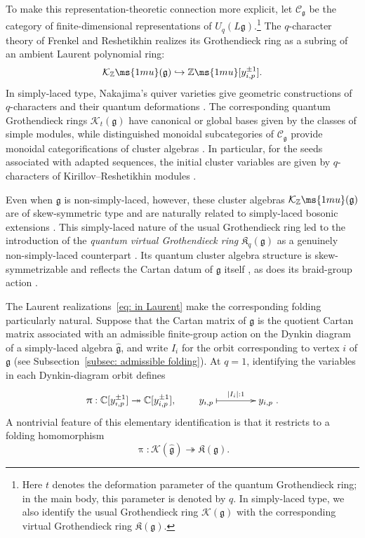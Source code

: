 \documentclass[12pt, leqno]{amsart}
\numberwithin{equation}{section}
\theoremstyle{plain}
\theoremstyle{definition}
\newcommand{\g}{\mathfrak{g}}
\newcommand{\C}{\mathbb{C}}
\newcommand{\Z}{\mathbb{Z}\ms{1mu}}
\newcommand{\im}{\imath}
\newcommand{\hg}{{\widehat{\g}}}
\newcommand{\frakK}{\mathfrak{K}}
\newcommand{\calK}{\mathcal{K}}
\newcommand{\scrC}{\mathscr{C}}
\begin{document}
To make this representation-theoretic connection more explicit, let
$\scrC_\g$ be the category of finite-dimensional representations of
$U_q(L\g)$.\footnote{Here $t$ denotes the deformation parameter of the quantum
Grothendieck ring; in the main body, this parameter is denoted by
$q$. In simply-laced type, we also identify the usual Grothendieck
ring $\calK(\g)$ with the corresponding virtual Grothendieck ring
$\frakK(\g)$.} The $q$-character theory of Frenkel and Reshetikhin
\cite{FR98,FR99} realizes its Grothendieck ring as a subring of an
ambient Laurent polynomial ring:
\begin{align} \label{eq: in Laurent}
\calK_\Z(\g)\hookrightarrow \Z[y_{i,p}^{\pm1}].
\end{align}
In simply-laced type, Nakajima's quiver varieties give geometric
constructions of $q$-characters and their quantum deformations
\cite{Nak01,Nak04,VV03}. The corresponding quantum Grothendieck rings
$\calK_t(\g)$ have canonical or global
bases given by the classes of simple modules, while distinguished
monoidal subcategories of $\scrC_\g$ provide monoidal
categorifications of cluster algebras
\cite{HL10,HL16,KKOP24A,KKOP25M}. In particular, for the seeds associated
with adapted sequences, the initial cluster variables are given by $q$-characters 
of Kirillov--Reshetikhin modules \cite{HL16,FHOO,JLO1}.

Even when $\g$ is non-simply-laced, however, these cluster algebras $\calK_\Z(\g)$
are of skew-symmetric type and are naturally related to simply-laced
bosonic extensions \cite{HL16,FHOO,B21}. This
simply-laced nature of the usual Grothendieck ring led to the
introduction of the \emph{quantum virtual Grothendieck ring}
$\frakK_q(\g)$ as a genuinely non-simply-laced counterpart
\cite{KO23,JLO1}. Its quantum cluster algebra structure is
skew-symmetrizable and reflects the Cartan datum of $\g$ itself
\cite{JLO1}, as does its braid-group action \cite{JLO2}.

The Laurent realizations~\eqref{eq: in Laurent}  make the corresponding
folding particularly natural.
 Suppose that the Cartan matrix of $\g$ is the quotient Cartan matrix
associated with an admissible finite-group action on the Dynkin
diagram of a simply-laced algebra $\hg$, and write $I_i$ for the
orbit corresponding to vertex $i$ of $\g$
(see Subsection~\ref{subsec: admissible folding}).
At $q=1$, identifying the variables in each Dynkin-diagram orbit defines
\[
\uppi:\C[y_{\im,p}^{\pm1}]
\twoheadrightarrow
\C[y_{i,p}^{\pm1}],
\qquad
\xymatrix@C=4em{
y_{\im,p}\ar@{|->}[r]^{\ |I_i|:1\ }&y_{i,p}
}.
\]
A nontrivial feature of this elementary identification is that it
restricts to a folding homomorphism
\[
\uppi:\calK(\hg)\twoheadrightarrow\frakK(\g).
\]
\end{document}
